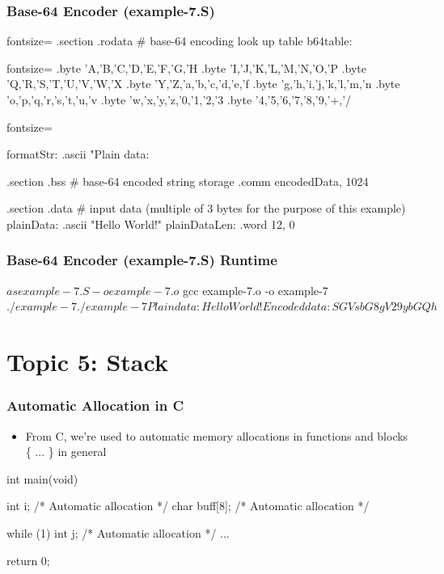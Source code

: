 \documentclass[11pt,xcolor=dvipsnames]{beamer}
\newcommand{\mvs}{\vspace{-0.95em}}
\begin{document}
\begin{frame}[fragile,t]
\frametitle{Base-64 Encoder (example-7.S)}
\mvs
\begin{gascode*}{fontsize=\fontsize{9}{8}}
.section .rodata
  # base-64 encoding look up table
  b64table:
\end{gascode*}
\begin{textcode*}{fontsize=\fontsize{9}{8}}
  .byte 'A,'B,'C,'D,'E,'F,'G,'H
  .byte 'I,'J,'K,'L,'M,'N,'O,'P
  .byte 'Q,'R,'S,'T,'U,'V,'W,'X
  .byte 'Y,'Z,'a,'b,'c,'d,'e,'f
  .byte 'g,'h,'i,'j,'k,'l,'m,'n
  .byte 'o,'p,'q,'r,'s,'t,'u,'v
  .byte 'w,'x,'y,'z,'0,'1,'2,'3
  .byte '4,'5,'6,'7,'8,'9,'+,'/
\end{textcode*}
\begin{gascode*}{fontsize=\fontsize{9}{8}}

formatStr:
  .ascii "Plain data: %

.section .bss
  # base-64 encoded string storage
  .comm encodedData, 1024

.section .data
  # input data (multiple of 3 bytes for the purpose of this example)
  plainData:      .ascii "Hello World!\0"
  plainDataLen:   .word 12, 0
\end{gascode*}
\end{frame}

\begin{frame}[fragile,t]
\frametitle{Base-64 Encoder (example-7.S) Runtime}
\mvs
\begin{textcode}
$ as example-7.S -o example-7.o
$ gcc example-7.o -o example-7
$ ./example-7
./example-7
Plain data: Hello World!
Encoded data: SGVsbG8gV29ybGQh
$
\end{textcode}
\end{frame}

\section{Topic 5: Stack}

\begin{frame}[fragile,t]
\frametitle{Automatic Allocation in C}
\begin{itemize}
  \item From C, we're used to automatic memory allocations in functions and blocks \{ ... \} in general
\end{itemize}
\begin{ccode}
int main(void) {
  int i;            /* Automatic allocation */
  char buff[8];     /* Automatic allocation */

  while (1) {
    int j;          /* Automatic allocation */
    ...
  }

  return 0;
}
\end{ccode}
\end{frame}
\end{document}
